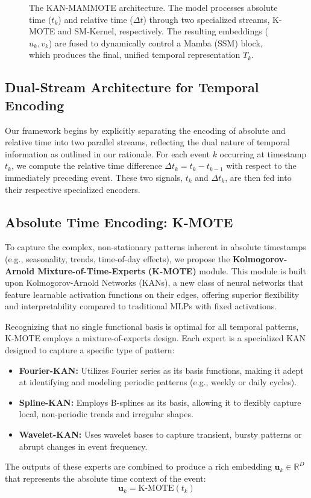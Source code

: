 \documentclass{article}
\begin{document}
\begin{figure}[h!]
    \centering
    \caption{The KAN-MAMMOTE architecture. The model processes absolute time ($t_k$) and relative time ($\Delta t$) through two specialized streams, K-MOTE and SM-Kernel, respectively. The resulting embeddings ($u_k, v_k$) are fused to dynamically control a Mamba (SSM) block, which produces the final, unified temporal representation $T_k$.}
    \label{fig:kan-mammote-architecture}
\end{figure}

\subsection{Dual-Stream Architecture for Temporal Encoding}
Our framework begins by explicitly separating the encoding of absolute and relative time into two parallel streams, reflecting the dual nature of temporal information as outlined in our rationale. For each event $k$ occurring at timestamp $t_k$, we compute the relative time difference $\Delta t_k = t_k - t_{k-1}$ with respect to the immediately preceding event. These two signals, $t_k$ and $\Delta t_k$, are then fed into their respective specialized encoders.

\subsection{Absolute Time Encoding: K-MOTE}
To capture the complex, non-stationary patterns inherent in absolute timestamps (e.g., seasonality, trends, time-of-day effects), we propose the \textbf{Kolmogorov-Arnold Mixture-of-Time-Experts (K-MOTE)} module. This module is built upon Kolmogorov-Arnold Networks (KANs), a new class of neural networks that feature learnable activation functions on their edges, offering superior flexibility and interpretability compared to traditional MLPs with fixed activations.

Recognizing that no single functional basis is optimal for all temporal patterns, K-MOTE employs a mixture-of-experts design. Each expert is a specialized KAN designed to capture a specific type of pattern:
\begin{itemize}
    \item \textbf{Fourier-KAN:} Utilizes Fourier series as its basis functions, making it adept at identifying and modeling periodic patterns (e.g., weekly or daily cycles).
    \item \textbf{Spline-KAN:} Employs B-splines as its basis, allowing it to flexibly capture local, non-periodic trends and irregular shapes.
    \item \textbf{Wavelet-KAN:} Uses wavelet bases to capture transient, bursty patterns or abrupt changes in event frequency.
\end{itemize}
The outputs of these experts are combined to produce a rich embedding $\mathbf{u}_k \in \mathbb{R}^D$ that represents the absolute time context of the event:
\begin{equation}
    \mathbf{u}_k = \text{K-MOTE}(t_k)
\end{equation}
\end{document}
